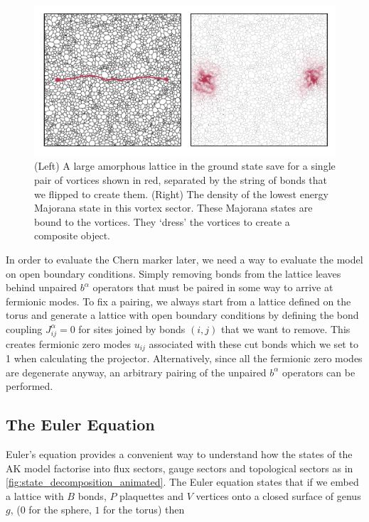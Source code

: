 \hypertarget{fig:majorana_bound_states_animated}{%
\begin{figure}
\centering
\includegraphics[width=1\textwidth,height=\textheight]{figure_code/amk_chapter/intro/majorana_bound_states_animated/majorana_bound_states_animated}
\caption[{Majorana Bound States}]{(Left) A large amorphous lattice in the ground state save for a single pair of vortices shown in red, separated by the string of bonds that we flipped to create them. (Right) The density of the lowest energy Majorana state in this vortex sector. These Majorana states are bound to the vortices. They `dress' the vortices to create a composite object.}
\label{fig:majorana_bound_states_animated}
\end{figure}
}

In order to evaluate the Chern marker later, we need a way to evaluate the model on open boundary conditions. Simply removing bonds from the lattice leaves behind unpaired \(b^\alpha\) operators that must be paired in some way to arrive at fermionic modes. To fix a pairing, we always start from a lattice defined on the torus and generate a lattice with open boundary conditions by defining the bond coupling \(J^{\alpha}_{ij} = 0\) for sites joined by bonds \((i,j)\) that we want to remove. This creates fermionic zero modes \(u_{ij}\) associated with these cut bonds which we set to 1 when calculating the projector. Alternatively, since all the fermionic zero modes are degenerate anyway, an arbitrary pairing of the unpaired \(b^\alpha\) operators can be performed.

\hypertarget{the-euler-equation}{%
\subsection{The Euler Equation}\label{the-euler-equation}}

Euler's equation provides a convenient way to understand how the states of the AK model factorise into flux sectors, gauge sectors and topological sectors as in \cref{fig:state_decomposition_animated}. The Euler equation states that if we embed a lattice with \(B\) bonds, \(P\) plaquettes and \(V\) vertices onto a closed surface of genus \(g\), (\(0\) for the sphere, \(1\) for the torus) then

